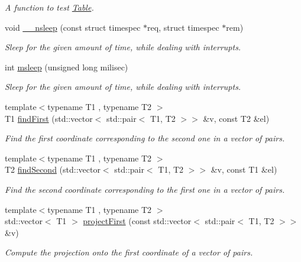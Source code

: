 \begin{DoxyCompactItemize}
\begin{DoxyCompactList}\small\item\em A function to test \hyperlink{structslb_1_1core_1_1util_1_1Table}{Table}. \end{DoxyCompactList}\item 
void \hyperlink{namespaceslb_1_1core_1_1util_accd7b27a31d025a5e141e3cd1eaad44f}{\+\_\+\+\_\+nsleep} (const struct timespec $\ast$req, struct timespec $\ast$rem)
\begin{DoxyCompactList}\small\item\em Sleep for the given amount of time, while dealing with interrupts. \end{DoxyCompactList}\item 
int \hyperlink{namespaceslb_1_1core_1_1util_a8982c5b1b1f4f7476f32f8f657ef3d9a}{msleep} (unsigned long milisec)
\begin{DoxyCompactList}\small\item\em Sleep for the given amount of time, while dealing with interrupts. \end{DoxyCompactList}\item 
{\footnotesize template$<$typename T1 , typename T2 $>$ }\\T1 \hyperlink{namespaceslb_1_1core_1_1util_aaf1dc3177dbb76fc2bc069c283139d90}{find\+First} (std\+::vector$<$ std\+::pair$<$ T1, T2 $>$$>$ \&v, const T2 \&el)
\begin{DoxyCompactList}\small\item\em Find the first coordinate corresponding to the second one in a vector of pairs. \end{DoxyCompactList}\item 
{\footnotesize template$<$typename T1 , typename T2 $>$ }\\T2 \hyperlink{namespaceslb_1_1core_1_1util_a95c07c3747fafdb0ef19871bbc131158}{find\+Second} (std\+::vector$<$ std\+::pair$<$ T1, T2 $>$$>$ \&v, const T1 \&el)
\begin{DoxyCompactList}\small\item\em Find the second coordinate corresponding to the first one in a vector of pairs. \end{DoxyCompactList}\item 
{\footnotesize template$<$typename T1 , typename T2 $>$ }\\std\+::vector$<$ T1 $>$ \hyperlink{namespaceslb_1_1core_1_1util_a7c70c706b5364fdd7b14480d1dac38f5}{project\+First} (const std\+::vector$<$ std\+::pair$<$ T1, T2 $>$$>$ \&v)
\begin{DoxyCompactList}\small\item\em Compute the projection onto the first coordinate of a vector of pairs. \end{DoxyCompactList}\item 
$$
\end{DoxyCompactItemize}
